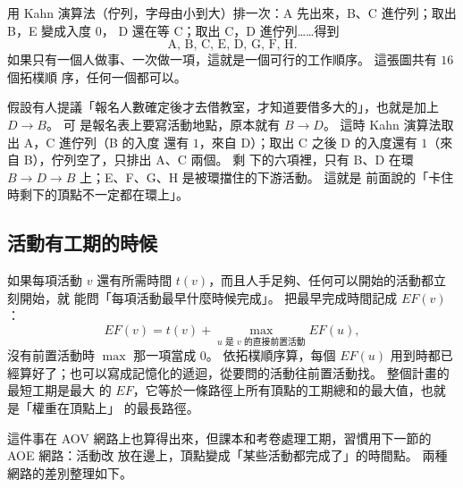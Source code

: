 \begin{center}
\label{fig:tps-aov}
\end{center}

用 Kahn 演算法（佇列，字母由小到大）排一次：A 先出來，B、C 進佇列；取出 B，E 變成入度 $0$，
D 還在等 C；取出 C，D 進佇列……得到
\[
\text{A, B, C, E, D, G, F, H}.
\]
如果只有一個人做事、一次做一項，這就是一個可行的工作順序。 這張圖共有 $16$ 個拓樸順
序，任何一個都可以。

假設有人提議「報名人數確定後才去借教室，才知道要借多大的」，也就是加上 $D \to B$。 可
是報名表上要寫活動地點，原本就有 $B \to D$。 這時 Kahn 演算法取出 A，C 進佇列（B 的入度
還有 $1$，來自 D）；取出 C 之後 D 的入度還有 $1$（來自 B），佇列空了，只排出 A、C 兩個。 剩
下的六項裡，只有 B、D 在環 $B \to D \to B$ 上；E、F、G、H 是被環擋住的下游活動。 這就是
前面說的「卡住時剩下的頂點不一定都在環上」。

\subsection{活動有工期的時候}

如果每項活動 $v$ 還有所需時間 $t(v)$，而且人手足夠、任何可以開始的活動都立刻開始，就
能問「每項活動最早什麼時候完成」。 把最早完成時間記成 $\mathit{EF}(v)$：
\[
\mathit{EF}(v) = t(v) + \max_{u \text{ 是 } v \text{ 的直接前置活動}} \mathit{EF}(u),
\]
沒有前置活動時 $\max$ 那一項當成 $0$。 依拓樸順序算，每個 $\mathit{EF}(u)$ 用到時都已
經算好了；也可以寫成記憶化的遞迴，從要問的活動往前置活動找。 整個計畫的最短工期是最大
的 $\mathit{EF}$，它等於一條路徑上所有頂點的工期總和的最大值，也就是「權重在頂點上」
的最長路徑。

這件事在 AOV 網路上也算得出來，但課本和考卷處理工期，習慣用下一節的 AOE 網路：活動改
放在邊上，頂點變成「某些活動都完成了」的時間點。 兩種網路的差別整理如下。

